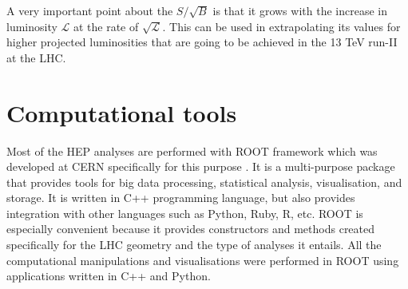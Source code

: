 A very important point about the $S/\sqrt{B}$ is that it grows with the increase in luminosity $\mathcal{L}$ at the rate of $\sqrt{\mathcal{L}}$. This can be used in extrapolating its values for higher projected luminosities that are going to be achieved in the 13 TeV run-II at the LHC.

\section{Computational tools}
Most of the HEP analyses are performed with ROOT framework which was developed at CERN specifically for this purpose \citep{root}. It is a multi-purpose package that provides tools for big data processing, statistical analysis, visualisation, and storage. It is written in C++ programming language, but also provides integration with other languages such as Python, Ruby, R, etc.  ROOT is especially convenient because it provides constructors and methods created specifically for the LHC geometry and the type of analyses it entails. All the computational manipulations and visualisations were performed in ROOT using applications written in C++ and Python. 




 

